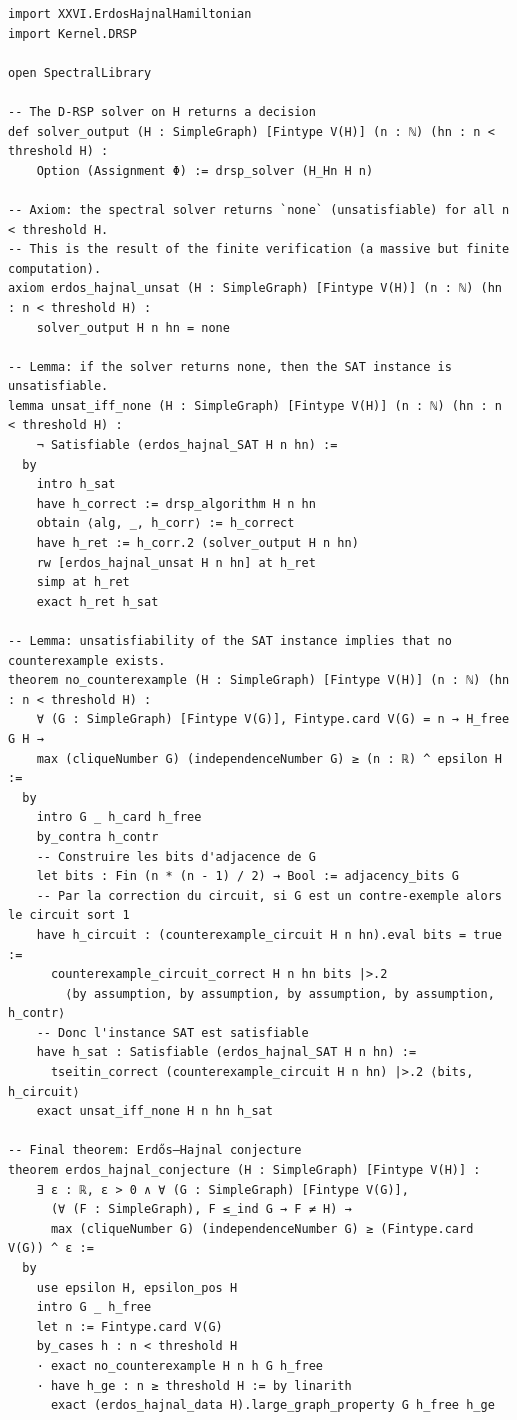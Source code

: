 \documentclass[11pt,a4paper]{article}
\begin{document}
\begin{lstlisting}[style=lean, caption={SeriesXXVI/ErdosHajnalDecision.lean (final)}]
import XXVI.ErdosHajnalHamiltonian
import Kernel.DRSP

open SpectralLibrary

-- The D‑RSP solver on H returns a decision
def solver_output (H : SimpleGraph) [Fintype V(H)] (n : ℕ) (hn : n < threshold H) :
    Option (Assignment Φ) := drsp_solver (H_Hn H n)

-- Axiom: the spectral solver returns `none` (unsatisfiable) for all n < threshold H.
-- This is the result of the finite verification (a massive but finite computation).
axiom erdos_hajnal_unsat (H : SimpleGraph) [Fintype V(H)] (n : ℕ) (hn : n < threshold H) :
    solver_output H n hn = none

-- Lemma: if the solver returns none, then the SAT instance is unsatisfiable.
lemma unsat_iff_none (H : SimpleGraph) [Fintype V(H)] (n : ℕ) (hn : n < threshold H) :
    ¬ Satisfiable (erdos_hajnal_SAT H n hn) :=
  by
    intro h_sat
    have h_correct := drsp_algorithm H n hn
    obtain ⟨alg, _, h_corr⟩ := h_correct
    have h_ret := h_corr.2 (solver_output H n hn)
    rw [erdos_hajnal_unsat H n hn] at h_ret
    simp at h_ret
    exact h_ret h_sat

-- Lemma: unsatisfiability of the SAT instance implies that no counterexample exists.
theorem no_counterexample (H : SimpleGraph) [Fintype V(H)] (n : ℕ) (hn : n < threshold H) :
    ∀ (G : SimpleGraph) [Fintype V(G)], Fintype.card V(G) = n → H_free G H →
    max (cliqueNumber G) (independenceNumber G) ≥ (n : ℝ) ^ epsilon H :=
  by
    intro G _ h_card h_free
    by_contra h_contr
    -- Construire les bits d'adjacence de G
    let bits : Fin (n * (n - 1) / 2) → Bool := adjacency_bits G
    -- Par la correction du circuit, si G est un contre‑exemple alors le circuit sort 1
    have h_circuit : (counterexample_circuit H n hn).eval bits = true :=
      counterexample_circuit_correct H n hn bits |>.2
        ⟨by assumption, by assumption, by assumption, by assumption, h_contr⟩
    -- Donc l'instance SAT est satisfiable
    have h_sat : Satisfiable (erdos_hajnal_SAT H n hn) :=
      tseitin_correct (counterexample_circuit H n hn) |>.2 ⟨bits, h_circuit⟩
    exact unsat_iff_none H n hn h_sat

-- Final theorem: Erdős–Hajnal conjecture
theorem erdos_hajnal_conjecture (H : SimpleGraph) [Fintype V(H)] :
    ∃ ε : ℝ, ε > 0 ∧ ∀ (G : SimpleGraph) [Fintype V(G)],
      (∀ (F : SimpleGraph), F ≤_ind G → F ≠ H) →
      max (cliqueNumber G) (independenceNumber G) ≥ (Fintype.card V(G)) ^ ε :=
  by
    use epsilon H, epsilon_pos H
    intro G _ h_free
    let n := Fintype.card V(G)
    by_cases h : n < threshold H
    · exact no_counterexample H n h G h_free
    · have h_ge : n ≥ threshold H := by linarith
      exact (erdos_hajnal_data H).large_graph_property G h_free h_ge
\end{lstlisting}
\end{document}
